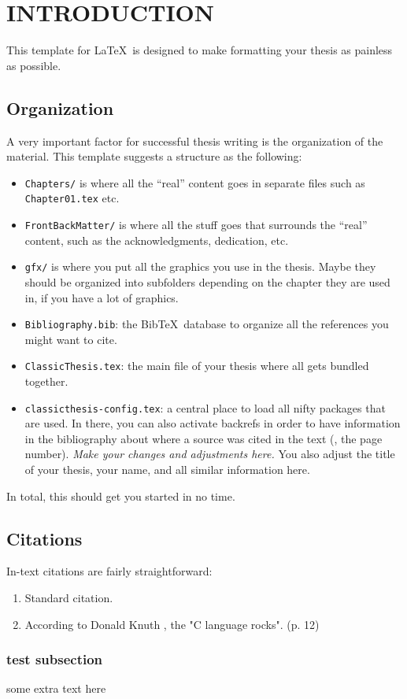 \chapter{INTRODUCTION}\label{ch:introduction}
This template for \LaTeX\ is designed to make formatting your thesis as painless as possible.
\section*{Organization}
A very important factor for successful thesis writing is the
organization of the material. This template suggests a structure as
the following:
\begin{itemize}
\item\texttt{Chapters/} is where all the ``real'' content goes in
separate files such as \texttt{Chapter01.tex} etc.
\item\texttt{FrontBackMatter/} is where all the stuff goes that
surrounds the ``real'' content, such as the acknowledgments,
dedication, etc.
\item\texttt{gfx/} is where you put all the graphics you use in
the thesis. Maybe they should be organized into subfolders
depending on the chapter they are used in, if you have a lot of
graphics.
\item\texttt{Bibliography.bib}: the Bib\TeX\ database to organize
all the references you might want to cite.
\item\texttt{ClassicThesis.tex}: the main file of your thesis
where all gets bundled together.
\item\texttt{classicthesis-config.tex}: a central place to load all
nifty packages that are used. In there, you can also activate
backrefs in order to have information in the bibliography about
where a source was cited in the text (\ie, the page number).
\emph{Make your changes and adjustments here.}
You also adjust the title of your thesis, your name, and all
similar information here.
\end{itemize}
In total, this should get you started in no time.
\section*{Citations}
In-text citations are fairly straightforward:
\begin{enumerate}
    \item Standard citation. \citep[][p. 123]{bringhurst:2002}
    \item According to Donald Knuth \citeyearpar{knuth:1976}, the "C language rocks". (p. 12)
\end{enumerate}
\subsection*{test subsection}
some extra text here
